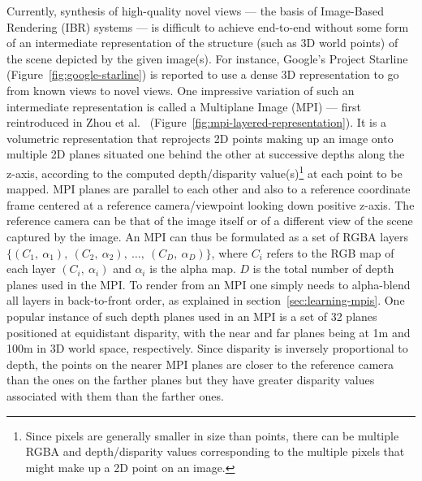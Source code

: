 Currently, synthesis of high-quality novel views --- the basis of Image-Based Rendering (IBR) systems --- is difficult to achieve end-to-end without some form of an intermediate representation of the structure (such as 3D world points) of the scene depicted by the given image(s). For instance, Google's Project Starline (Figure~\ref{fig:google-starline}) is reported to use a dense 3D representation to go from known views to novel views. One impressive variation of such an intermediate representation is called a Multiplane Image (MPI) --- first reintroduced in Zhou et al.~\cite{zhou2018stereo} (Figure~\ref{fig:mpi-layered-representation}). It is a volumetric representation that reprojects 2D points making up an image onto multiple 2D planes situated one behind the other at successive depths along the z-axis, according to the computed depth/disparity value(s)\footnote{Since pixels are generally smaller in size than points, there can be multiple RGBA and depth/disparity values corresponding to the multiple pixels that might make up a 2D point on an image.} at each point to be mapped. MPI planes are parallel to each other and also to a reference coordinate frame centered at a reference camera/viewpoint looking down positive z-axis. The reference camera can be that of the image itself or of a different view of the scene captured by the image. An MPI can thus be formulated as a set of RGBA layers $\{(C_1,\ \alpha_1),\ (C_2,\ \alpha_2),\ \ldots,\ (C_D,\ \alpha_D)\}$, where $C_i$ refers to the RGB map of each layer $(C_i,\ \alpha_i)$ and $\alpha_i$ is the alpha map. $D$ is the total number of depth planes used in the MPI. To render from an MPI one simply needs to alpha-blend all layers in back-to-front order, as explained in section~\ref{sec:learning-mpis}. One popular instance of such depth planes used in an MPI is a set of 32 planes positioned at equidistant disparity, with the near and far planes being at 1m and 100m in 3D world space, respectively. Since disparity is inversely proportional to depth, the points on the nearer MPI planes are closer to the reference camera than the ones on the farther planes but they have greater disparity values associated with them than the farther ones.

